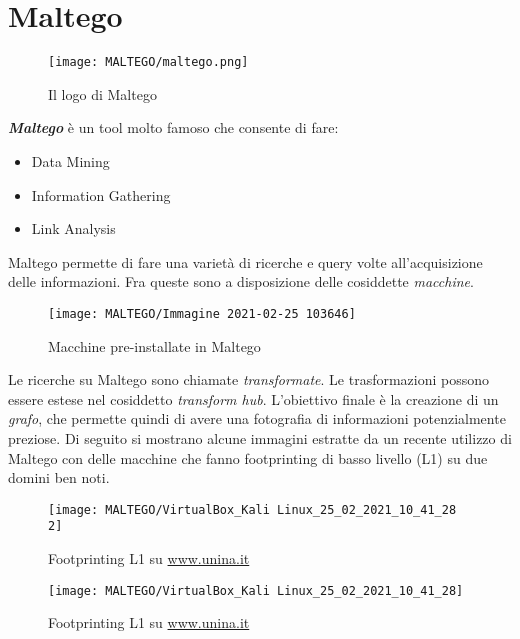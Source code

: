 \documentclass[14pt]{extreport}
\begin{document}
\section{Maltego}


\begin{figure}[H]
    \centering
    \texttt{[image: MALTEGO/maltego.png]}
    \caption{Il logo di Maltego}
\end{figure}

\textbf{\textit{Maltego}} è un tool molto famoso che consente di fare:

\begin{itemize}
    \item Data Mining
    \item Information Gathering
    \item Link Analysis
\end{itemize}

Maltego permette di fare una varietà di ricerche e query volte all'acquisizione delle informazioni. Fra queste sono a disposizione delle cosiddette \textit{macchine}.

\begin{figure}[H]
    \centering
    \texttt{[image: MALTEGO/Immagine 2021-02-25 103646]}
    \caption{Macchine pre-installate in Maltego}
\end{figure}


Le ricerche su Maltego sono chiamate \textit{transformate}. Le trasformazioni possono essere estese nel cosiddetto \textit{transform hub}. L'obiettivo finale è la creazione di un \textit{grafo}, che permette quindi di avere una fotografia di informazioni potenzialmente preziose.
Di seguito si mostrano alcune immagini estratte da un recente utilizzo di Maltego con delle macchine che fanno footprinting di basso livello (L1) su due domini ben noti.

\begin{figure}[H]
    \centering
    \texttt{[image: MALTEGO/VirtualBox\_Kali Linux\_25\_02\_2021\_10\_41\_28 2]}
    \caption{Footprinting L1 su \url{www.unina.it}}
\end{figure}



\begin{figure}[H]
    \centering
    \texttt{[image: MALTEGO/VirtualBox\_Kali Linux\_25\_02\_2021\_10\_41\_28]}
    \caption{Footprinting L1 su \url{www.unina.it}}
\end{figure}
\end{document}
